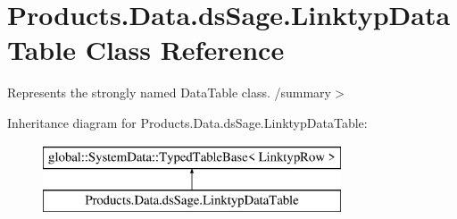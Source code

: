 \hypertarget{class_products_1_1_data_1_1ds_sage_1_1_linktyp_data_table}{}\section{Products.\+Data.\+ds\+Sage.\+Linktyp\+Data\+Table Class Reference}
\label{class_products_1_1_data_1_1ds_sage_1_1_linktyp_data_table}


Represents the strongly named Data\+Table class. /summary$>$  


Inheritance diagram for Products.\+Data.\+ds\+Sage.\+Linktyp\+Data\+Table\+:\begin{figure}[H]
\begin{center}
\leavevmode
\includegraphics[height=2.000000cm]{class_products_1_1_data_1_1ds_sage_1_1_linktyp_data_table}
\end{center}
\end{figure}

